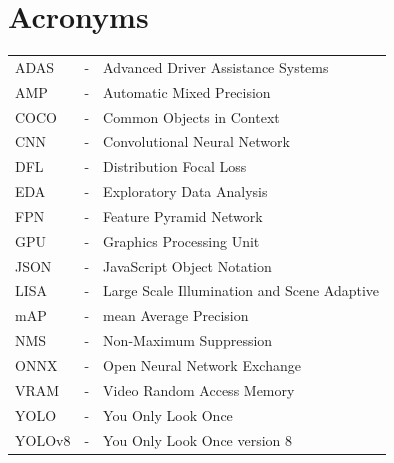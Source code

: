 \chapter*{Acronyms}

\noindent \begin{tabular}{lcl}
ADAS  & - & Advanced Driver Assistance Systems\\
AMP   & - & Automatic Mixed Precision\\
COCO  & - & Common Objects in Context\\
CNN   & - & Convolutional Neural Network\\
DFL   & - & Distribution Focal Loss\\
EDA   & - & Exploratory Data Analysis\\
FPN   & - & Feature Pyramid Network\\
GPU   & - & Graphics Processing Unit\\
JSON  & - & JavaScript Object Notation\\
LISA  & - & Large Scale Illumination and Scene Adaptive\\
mAP   & - & mean Average Precision\\
NMS   & - & Non-Maximum Suppression\\
ONNX  & - & Open Neural Network Exchange\\
VRAM  & - & Video Random Access Memory\\
YOLO  & - & You Only Look Once\\
YOLOv8 & - & You Only Look Once version 8\\
\end{tabular}


